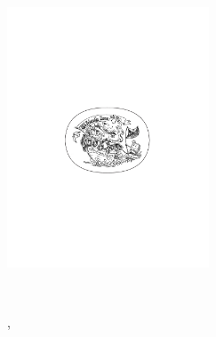 \begin{titlepage}
    \begin{addmargin}[-1cm]{-3cm}
    \begin{center}
        \large

        \hfill

        \vfill

        \begingroup
            \color{Maroon}\spacedallcaps{\myTitle} \\ \bigskip
        \endgroup

        \spacedlowsmallcaps{\myName}

        \vfill

        \includegraphics[width=6cm]{gfx/TFZsuperellipse_bw} \\ \medskip

        \begingroup
        	\color{Maroon}\mySubtitle \\ \medskip  \medskip
        \endgroup


        \vfill

        \myProf, \myOtherProf \\
        \myUni \\ \bigskip

        \myTime\ %

        \vfill

    \end{center}
  \end{addmargin}
\end{titlepage}
